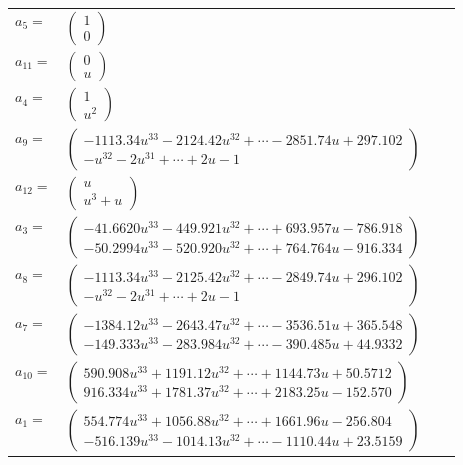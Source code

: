 \documentclass[1p]{elsarticle_modified}
\theoremstyle{definition}
\begin{document}
\begin{tabular}{m{7pt} m{180pt} m{7pt} m{180pt} }
\flushright $a_{5}=$&$\begin{pmatrix}1\\0\end{pmatrix}$ \\
\flushright $a_{11}=$&$\begin{pmatrix}0\\u\end{pmatrix}$ \\
\flushright $a_{4}=$&$\begin{pmatrix}1\\u^2\end{pmatrix}$ \\
\flushright $a_{9}=$&$\begin{pmatrix}-1113.34 u^{33}-2124.42 u^{32}+\cdots-2851.74 u+297.102\\- u^{32}-2 u^{31}+\cdots+2 u-1\end{pmatrix}$ \\
\flushright $a_{12}=$&$\begin{pmatrix}u\\u^3+u\end{pmatrix}$ \\
\flushright $a_{3}=$&$\begin{pmatrix}-41.6620 u^{33}-449.921 u^{32}+\cdots+693.957 u-786.918\\-50.2994 u^{33}-520.920 u^{32}+\cdots+764.764 u-916.334\end{pmatrix}$ \\
\flushright $a_{8}=$&$\begin{pmatrix}-1113.34 u^{33}-2125.42 u^{32}+\cdots-2849.74 u+296.102\\- u^{32}-2 u^{31}+\cdots+2 u-1\end{pmatrix}$ \\
\flushright $a_{7}=$&$\begin{pmatrix}-1384.12 u^{33}-2643.47 u^{32}+\cdots-3536.51 u+365.548\\-149.333 u^{33}-283.984 u^{32}+\cdots-390.485 u+44.9332\end{pmatrix}$ \\
\flushright $a_{10}=$&$\begin{pmatrix}590.908 u^{33}+1191.12 u^{32}+\cdots+1144.73 u+50.5712\\916.334 u^{33}+1781.37 u^{32}+\cdots+2183.25 u-152.570\end{pmatrix}$ \\
\flushright $a_{1}=$&$\begin{pmatrix}554.774 u^{33}+1056.88 u^{32}+\cdots+1661.96 u-256.804\\-516.139 u^{33}-1014.13 u^{32}+\cdots-1110.44 u+23.5159\end{pmatrix}$ \\

\end{tabular}
\end{document}
